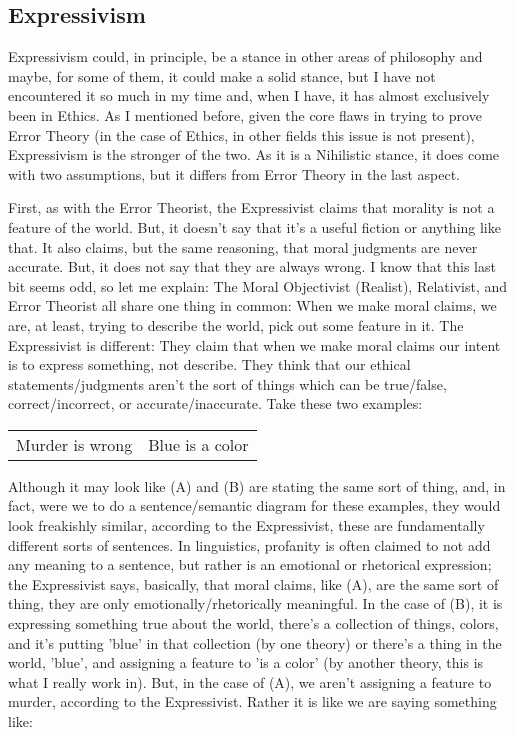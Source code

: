\subsection{Expressivism}

Expressivism could, in principle, be a stance in other areas of philosophy and maybe, for some of them, it could make a solid stance, but I have not encountered it so much in my time and, when I have, it has almost exclusively been in Ethics. As I mentioned before, given the core flaws in trying to prove Error Theory (in the case of Ethics, in other fields this issue is not present), Expressivism is the stronger of the two. As it is a Nihilistic stance, it does come with two assumptions, but it differs from Error Theory in the last aspect.

First, as with the Error Theorist, the Expressivist claims that morality is not a feature of the world. But, it doesn't say that it's a useful fiction or anything like that. It also claims, but the same reasoning, that moral judgments are never accurate. But, it does not say that they are always wrong. I know that this last bit seems odd, so let me explain: The Moral Objectivist (Realist), Relativist, and Error Theorist all share one thing in common: When we make moral claims, we are, at least, trying to describe the world, pick out some feature in it. The Expressivist is different: They claim that when we make moral claims our intent is to express something, not describe. They think that our ethical statements/judgments aren't the sort of things which can be true/false, correct/incorrect, or accurate/inaccurate. Take these two examples: 
\begin{tabular}{p{1in}|p{1in}}
    Murder is wrong&Blue is a color
\end{tabular}
Although it may look like (A) and (B) are stating the same sort of thing, and, in fact, were we to  do a sentence/semantic diagram for these examples, they would look freakishly similar, according to the Expressivist, these are fundamentally different sorts of sentences. In linguistics, profanity is often claimed to not add any meaning to a sentence, but rather is an emotional or rhetorical expression; the Expressivist says, basically, that moral claims, like (A), are the same sort of thing, they are only emotionally/rhetorically meaningful. In the case of (B), it is expressing something true about the world, there's a collection of things, colors, and it's putting 'blue' in that collection (by one theory) or there's a thing in the world, 'blue', and assigning a feature to 'is a color' (by another theory, this is what I really work in). But, in the case of (A), we aren’t assigning a feature to murder, according to the Expressivist. Rather it is like we are saying something like:
